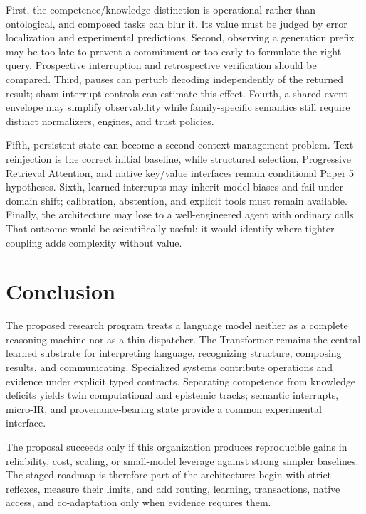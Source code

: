 \documentclass[11pt]{article}
\begin{document}
First, the competence/knowledge distinction is operational rather than
ontological, and composed tasks can blur it.  Its value must be judged by error
localization and experimental predictions.  Second, observing a generation
prefix may be too late to prevent a commitment or too early to formulate the
right query.  Prospective interruption and retrospective verification should be
compared.  Third, pauses can perturb decoding independently of the returned
result; sham-interrupt controls can estimate this effect.  Fourth, a shared
event envelope may simplify observability while family-specific semantics still
require distinct normalizers, engines, and trust policies.

Fifth, persistent state can become a second context-management problem.  Text
reinjection is the correct initial baseline, while structured selection,
Progressive Retrieval Attention, and native key/value interfaces remain
conditional Paper 5 hypotheses.  Sixth, learned interrupts may inherit model
biases and fail under domain shift; calibration, abstention, and explicit tools
must remain available.  Finally, the architecture may lose to a well-engineered
agent with ordinary calls.  That outcome would be scientifically useful: it
would identify where tighter coupling adds complexity without value.

\section{Conclusion}

The proposed research program treats a language model neither as a complete
reasoning machine nor as a thin dispatcher.  The Transformer remains the central
learned substrate for interpreting language, recognizing structure, composing
results, and communicating.  Specialized systems contribute operations and
evidence under explicit typed contracts.  Separating competence from knowledge
deficits yields twin computational and epistemic tracks; semantic interrupts,
micro-IR, and provenance-bearing state provide a common experimental interface.

The proposal succeeds only if this organization produces reproducible gains in
reliability, cost, scaling, or small-model leverage against strong simpler
baselines.  The staged roadmap is therefore part of the architecture: begin
with strict reflexes, measure their limits, and add routing, learning,
transactions, native access, and co-adaptation only when evidence requires them.
\end{document}
